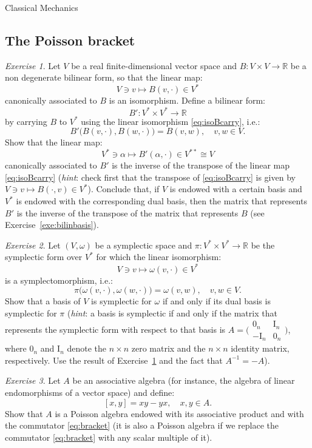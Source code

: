 \documentclass[oneside,a4paper,11pt]{amsbook}
\newcommand{\R}{\mathds R}
\newcommand{\I}{\mathrm I}
\theoremstyle{remark}\newtheorem{exercise}{Exercise}[chapter]
\theoremstyle{plain}\newtheorem{teo}{Theorem}[section]
\theoremstyle{plain}\newtheorem{lem}[teo]{Lemma}
\theoremstyle{plain}\newtheorem{prop}[teo]{Proposition}
\theoremstyle{plain}\newtheorem{cor}[teo]{Corollary}
\theoremstyle{definition}\newtheorem{defin}[teo]{Definition}
\theoremstyle{remark}\newtheorem{rem}[teo]{Remark}
\theoremstyle{definition}\newtheorem{notation}[teo]{Notation}
\theoremstyle{definition}\newtheorem{convention}[teo]{Convention}
\theoremstyle{definition}\newtheorem{example}[teo]{Example}
\numberwithin{section}{chapter}
\numberwithin{equation}{section}
\begin{document}
\begin{chapter}{Classical Mechanics}
\subsection*{The Poisson bracket}

\begin{exercise}\label{exe:basisBprime}
Let $V$ be a real finite-dimensional vector space and $B:V\times V\to\R$ be a non degenerate bilinear form, so that the linear map:
\begin{equation}\label{eq:isoBcarry}
V\ni v\longmapsto B(v,\cdot)\in V^*
\end{equation}
canonically associated to $B$ is an isomorphism. Define a bilinear form:
\[B':V^*\times V^*\longrightarrow\R\]
by carrying $B$ to $V^*$ using the linear isomorphism
\eqref{eq:isoBcarry}, i.e.:
\[B'\big(B(v,\cdot),B(w,\cdot)\big)=B(v,w),\quad v,w\in V.\]
Show that the linear map:
\[V^*\ni\alpha\longmapsto B'(\alpha,\cdot)\in V^{**}\cong V\]
canonically associated to $B'$ is the inverse of the transpose of the linear map \eqref{eq:isoBcarry} ({\em hint}: check first that
the transpose of \eqref{eq:isoBcarry} is given by $V\ni v\mapsto B(\cdot,v)\in V^*$).
Conclude that, if $V$ is endowed with a certain basis and $V^*$ is endowed with the corresponding dual basis, then the matrix
that represents $B'$ is the inverse of the transpose of the matrix that represents $B$ (see Exercise~\ref{exe:bilinbasis}).
\end{exercise}

\begin{exercise}\label{exe:symplomegapi}
Let $(V,\omega)$ be a symplectic space and $\pi:V^*\times V^*\to\R$ be the symplectic form over $V^*$ for which the linear isomorphism:
\[V\ni v\longmapsto\omega(v,\cdot)\in V^*\]
is a symplectomorphism, i.e.:
\[\pi\big(\omega(v,\cdot),\omega(w,\cdot)\big)=\omega(v,w),\quad v,w\in V.\]
Show that a basis of $V$ is symplectic for $\omega$ if and only if its dual basis is symplectic for $\pi$ ({\em hint}: a basis is symplectic if and only
if the matrix that represents the symplectic form with respect to that basis is $A=\big(\begin{smallmatrix}0_n&\I_n\\-\I_n&0_n\end{smallmatrix}\big)$,
where $0_n$ and $\I_n$ denote the $n\times n$ zero matrix and the $n\times n$ identity matrix, respectively. Use the result of Exercise~\ref{exe:basisBprime}
and the fact that $A^{-1}=-A$).
\end{exercise}

\begin{exercise}\label{exe:noncomPoisson}
Let $A$ be an associative algebra (for instance, the algebra of linear endomorphisms of a vector space) and define:
\begin{equation}\label{eq:bracket}
[x,y]=xy-yx,\quad x,y\in A.
\end{equation}
Show that $A$ is a Poisson algebra endowed with its associative product and with the commutator \eqref{eq:bracket}
(it is also a Poisson algebra if we replace the commutator \eqref{eq:bracket} with any scalar multiple of it).
\end{exercise}


\end{chapter}
\end{document}

